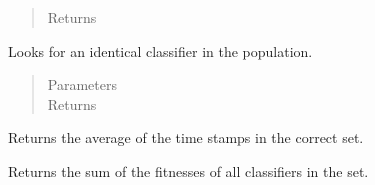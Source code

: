 \documentclass[letterpaper,10pt,english]{sphinxmanual}
\begin{document}
\begin{fulllineitems}
\begin{fulllineitems}
\begin{quote}
\begin{description}
\item[{Returns}] \leavevmode


\end{description}\end{quote}

\end{fulllineitems}


\begin{fulllineitems}
\label{\detokenize{eLCS:eLCS.ClassifierSet.ClassifierSet.getIdenticalClassifier}}
Looks for an identical classifier in the population.
\begin{quote}\begin{description}
\item[{Parameters}] \leavevmode
{} \textendash{} 

\item[{Returns}] \leavevmode


\end{description}\end{quote}

\end{fulllineitems}


\begin{fulllineitems}
\label{\detokenize{eLCS:eLCS.ClassifierSet.ClassifierSet.getIterStampAverage}}
Returns the average of the time stamps in the correct set.

\end{fulllineitems}


\begin{fulllineitems}
\label{\detokenize{eLCS:eLCS.ClassifierSet.ClassifierSet.getPopFitnessSum}}
Returns the sum of the fitnesses of all classifiers in the set.

\end{fulllineitems}



\end{fulllineitems}
\end{document}
